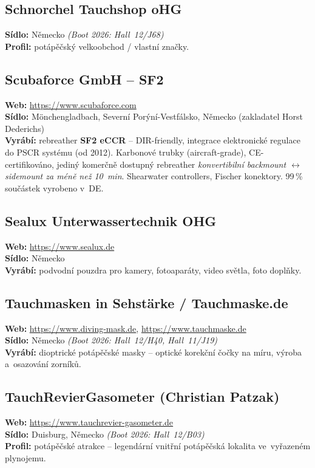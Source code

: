 \documentclass[11pt,a4paper]{article}
\begin{document}
\subsection{Schnorchel Tauchshop oHG}
\textbf{Sídlo:} Německo \quad\emph{(Boot 2026: Hall~12/J68)} \\
\textbf{Profil:} potápěčský velkoobchod / vlastní značky.

\subsection{Scubaforce GmbH -- SF2}
\textbf{Web:} \url{https://www.scubaforce.com} \\
\textbf{Sídlo:} Mönchengladbach, Severní Porýní-Vestfálsko, Německo (zakladatel Horst Dederichs) \\
\textbf{Vyrábí:} rebreather \textbf{SF2 eCCR} -- DIR-friendly, integrace elektronické regulace do PSCR systému (od 2012). Karbonové trubky (aircraft-grade), CE-certifikováno, jediný komerčně dostupný rebreather \emph{konvertibilní backmount $\leftrightarrow$ sidemount za méně než 10~min}. Shearwater controllers, Fischer konektory. 99\,\% součástek vyrobeno v~DE.

\subsection{Sealux Unterwassertechnik OHG}
\textbf{Web:} \url{https://www.sealux.de} \\
\textbf{Sídlo:} Německo \\
\textbf{Vyrábí:} podvodní pouzdra pro kamery, fotoaparáty, video světla, foto doplňky.

\subsection{Tauchmasken in Sehstärke / Tauchmaske.de}
\textbf{Web:} \url{https://www.diving-mask.de}, \url{https://www.tauchmaske.de} \\
\textbf{Sídlo:} Německo \quad\emph{(Boot 2026: Hall~12/H40, Hall~11/J19)} \\
\textbf{Vyrábí:} dioptrické potápěčské masky -- optické korekční čočky na míru, výroba a~osazování zorníků.

\subsection{TauchRevierGasometer (Christian Patzak)}
\textbf{Web:} \url{https://www.tauchrevier-gasometer.de} \\
\textbf{Sídlo:} Duisburg, Německo \quad\emph{(Boot 2026: Hall~12/B03)} \\
\textbf{Profil:} potápěčské atrakce -- legendární vnitřní potápěčská lokalita ve~vyřazeném plynojemu.
\end{document}
